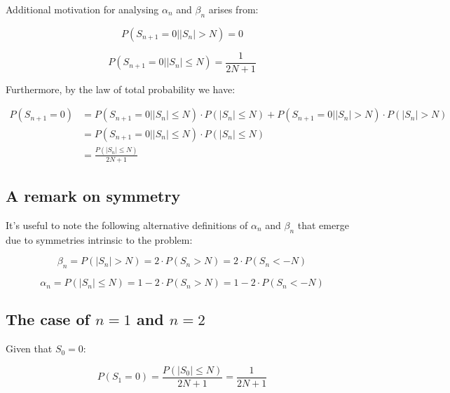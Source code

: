 \documentclass{article}
\begin{document}
Additional motivation for analysing $\alpha_n$ and $\beta_n$ arises from:

\begin{equation}
P(S_{n+1} = 0 | \lvert S_n \rvert > N) = 0
\end{equation}

\begin{equation}
P(S_{n+1} = 0 | \lvert S_n \rvert \leq N) = \frac{1}{2N+1}
\end{equation}

Furthermore, by the law of total probability we have:

\begin{equation}
\begin{split}
P(S_{n+1}=0) & = P(S_{n+1}=0|\lvert S_n \rvert \leq N) \cdot P(\lvert S_n \rvert \leq N) + P(S_{n+1}=0|\lvert S_n \rvert > N) \cdot P(\lvert S_n \rvert > N) \\\
& = P(S_{n+1}=0|\lvert S_n \rvert \leq N) \cdot P(\lvert S_n \rvert \leq N) \\\
& = \frac{P(\lvert S_n \rvert \leq N)}{2N+1}
\end{split}
\end{equation}

\newpage 

\subsection{A remark on symmetry}

It's useful to note the following alternative definitions of $\alpha_n$ and $\beta_n$ that emerge
due to symmetries intrinsic to the problem:

\begin{equation}
	\beta_n = P(\lvert S_n \rvert > N) = 2 \cdot P(S_n > N) = 2 \cdot P(S_n < -N)
\end{equation}

\begin{equation}
	\alpha_n = P(\lvert S_n \rvert \leq N) = 1-2 \cdot P(S_n > N)=1-2 \cdot P(S_n < -N)
\end{equation}

\subsection{The case of $n=1$ and $n=2$}

Given that $S_0=0$:

\begin{equation}
	P(S_1=0)=\frac{P(\lvert S_0 \rvert \leq N)}{2N+1}= \frac{1}{2N+1}
\end{equation}
\end{document}
